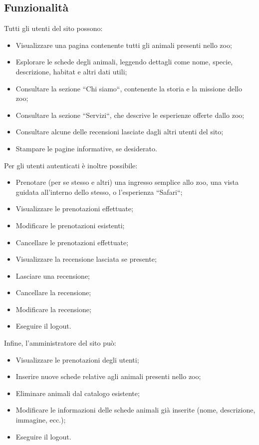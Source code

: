 \subsection{Funzionalit\`a}
Tutti gli utenti del sito possono:
\begin{itemize}
    \item Visualizzare una pagina contenente tutti gli animali presenti nello zoo;
    \item Esplorare le schede degli animali, leggendo dettagli come nome, specie, descrizione, habitat e altri dati utili;
    \item Consultare la sezione ``Chi siamo``, contenente la storia e la missione dello zoo;
    \item Consultare la sezione ``Servizi``, che descrive le esperienze offerte dallo zoo;
    \item Consultare alcune delle recensioni lasciate dagli altri utenti del sito;
    \item Stampare le pagine informative, se desiderato.
\end{itemize}
Per gli utenti autenticati è inoltre possibile:
\begin{itemize}
    \item Prenotare (per se stesso e altri) una ingresso semplice allo zoo, una vista guidata all'interno dello stesso, o l'esperienza ``Safari``;
    \item Visualizzare le prenotazioni effettuate;
    \item Modificare le prenotazioni esistenti;
    \item Cancellare le prenotazioni effettuate;
    \item Visualizzare la recensione lasciata se presente;
    \item Lasciare una recensione;
    \item Cancellare la recensione;
    \item Modificare la recensione;
    \item Eseguire il logout.
\end{itemize}
Infine, l’amministratore del sito può:
\begin{itemize}
    \item Visualizzare le prenotazioni degli utenti;
    \item Inserire nuove schede relative agli animali presenti nello zoo;
    \item Eliminare animali dal catalogo esistente;
    \item Modificare le informazioni delle schede animali già inserite (nome, descrizione, immagine, ecc.);
    \item Eseguire il logout.
\end{itemize}

